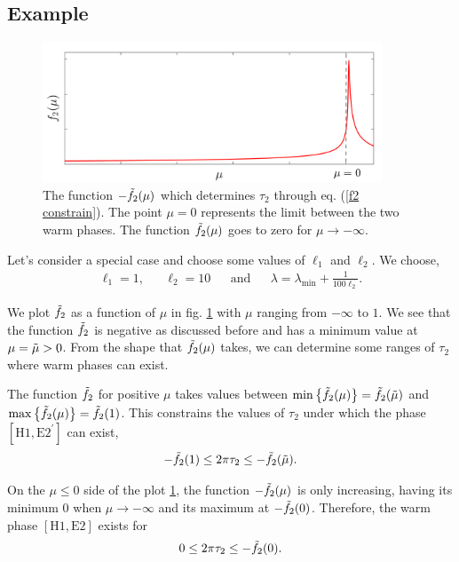 \subsection{Example}

\begin{figure}
    \centering
    \includegraphics[width=0.9\textwidth]{figures/f23.png}
    \caption{The function $-\Tilde{f}_2(\mu)$ which determines $\tau_2$ through eq. (\ref{f2 constrain}). The point $\mu = 0$ represents the limit between the two warm phases. The function $\Tilde{f}_2(\mu)$ goes to zero for $\mu\rightarrow-\infty$.}
    \label{f2}
\end{figure}

Let's consider a special case and choose some values of $\ell_1$ and $\ell_2$. We choose,
\begin{align}
    \ell_1 = 1, && \ell_2 = 10 && \text{and} && \lambda = \lambda_{\text{min}} + \frac{1}{100\ell_2}.
\end{align}

We plot $\Tilde{f}_2$ as a function of $\mu$ in fig. \ref{f2} with $\mu$ ranging from $-\infty$ to $1$. We see that the function $\Tilde{f}_2$ is negative as discussed before and has a minimum value at $\mu = \Tilde{\mu}>0$. From the shape that $\Tilde{f}_2(\mu)$ takes, we can determine some ranges of $\tau_2$ where warm phases can exist.

The function $\Tilde{f}_2$ for positive $\mu$ takes values between $\min\left\{\Tilde{f}_2(\mu)\right\}=\Tilde{f}_2(\Tilde{\mu})$ and $\max\left\{\Tilde{f}_2(\mu)\right\} = \Tilde{f}_2(1)$. This constrains the values of $\tau_2$ under which the phase $\left[\text{H}1,\text{E}2^{\prime}\right]$ can exist,
\begin{equation}
    -\Tilde{f}_2(1)\leq 2\pi\tau_2\leq - \Tilde{f}_2(\Tilde{\mu}).
\end{equation}

On the $\mu\leq 0$ side of the plot \ref{f2}, the function $-\Tilde{f}_2(\mu)$ is only increasing, having its minimum 0 when $\mu\rightarrow-\infty$ and its maximum at $-\Tilde{f}_2(0)$. Therefore, the warm phase $\left[\text{H}1,\text{E}2\right]$ exists for
\begin{equation}
    0 \leq 2\pi\tau_2\leq - \Tilde{f}_2(0).
\end{equation}

